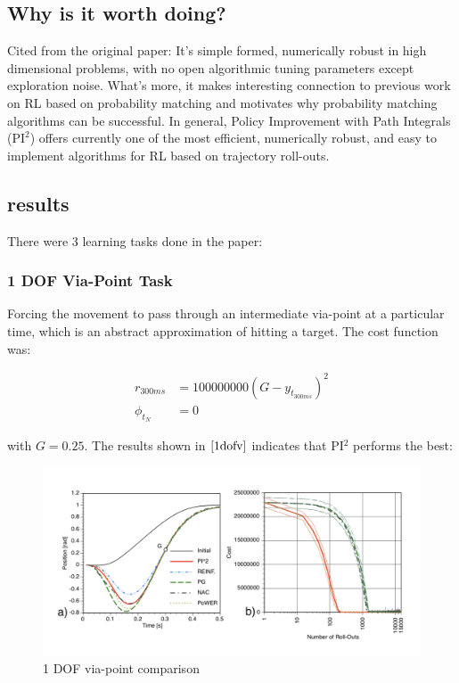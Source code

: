 \documentclass[journal]{IEEEtran}
\begin{document}
\begin{table}
   \end{table}


\subsection{Why is it worth doing?}

Cited from the original paper: It's simple formed, numerically robust in high dimensional problems, with no open algorithmic tuning parameters except exploration noise. What's more, it makes interesting connection to previous work on RL based on
probability matching and motivates why probability matching algorithms can be successful. In general,
Policy Improvement with Path Integrals ($\mbox{PI}^2$) offers currently one of the most efficient, numerically robust, and easy to implement algorithms for RL based on trajectory roll-outs.


\subsection{results}
There were 3 learning tasks done in the paper:
\subsubsection{ 1 DOF Via-Point Task}

Forcing the movement to pass through an intermediate via-point at a particular time, which is an abstract approximation of hitting a
target.
The cost function was:

\begin{equation} 
  \begin{aligned}
    r_{300ms} &= 100000000(G- y_{t_{300ms}})^2 \\
    \phi_{t_N} &= 0  \nonumber 
  \end{aligned}
\end{equation}

with $G = 0.25$. 
The results shown in $\ref{1dofv}$ indicates that PI$^2$ performs the best:
\begin{figure}[htbp]
  \includegraphics[width = .5\textwidth]{1dofv}
  \caption{1 DOF via-point comparison}
  \label{1dofv}
\end{figure}
\end{document}
